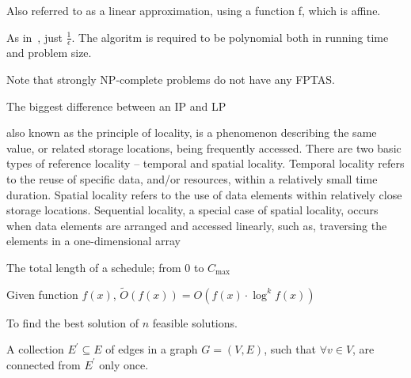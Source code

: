 \begin{definition}[F-approximation]
    Also referred to as a linear approximation, using a function f,
    which is affine.
\end{definition}

\begin{definition}\label{FPTAS}
    As in~, just $\frac{1}{\epsilon}$.
    The algoritm is required to be polynomial both in running time and problem
    size.

    Note that strongly NP-complete problems do not have any FPTAS.\
\end{definition}

\begin{definition}\label{integralitygap}
    The biggest difference between an IP and LP
\end{definition}

\begin{definition}
     also known as the principle of locality, is a phenomenon describing the
     same value, or related storage locations, being frequently accessed. There
     are two basic types of reference locality – temporal and spatial locality.
     Temporal locality refers to the reuse of specific data, and/or resources,
     within a relatively small time duration. Spatial locality refers to the
     use of data elements within relatively close storage locations. Sequential
     locality, a special case of spatial locality, occurs when data elements
     are arranged and accessed linearly, such as, traversing the elements in a
     one-dimensional array

\end{definition}

\begin{definition}[Makespan]
    The total length of a schedule; from 0 to $C_{\max}$
\end{definition}

\begin{definition}[$\tilde{O}$]\label{otilde}
    Given function $f(x)$, $\tilde{O}(f(x)) = O(f(x)\cdot{\log^{k}{f(x)}})$
\end{definition}

\begin{definition}\label{optproblem}
    To find the best solution of $n$ feasible solutions.
\end{definition}

\begin{definition}
    A collection $E^{\prime} \subseteq E$ of edges in a graph 
    $G = (V,E)$, such that $\forall v \in V$, are connected 
    from $E^{\prime}$ only once.
\end{definition}



